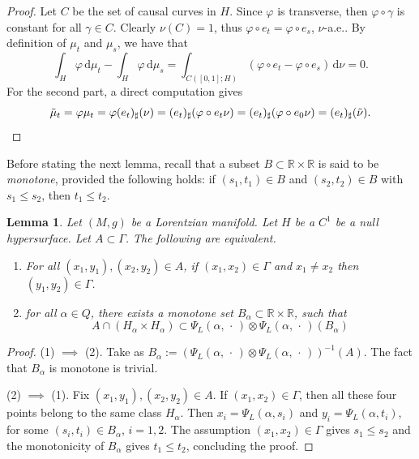 \documentclass[12pt,a4paper]{amsart}
\theoremstyle{plain}
\newtheorem{lemma}{Lemma}[section]
\theoremstyle{definition}
\numberwithin{equation}{section}
\newcommand{\R}{\mathbb{R}}
\newcommand{\de}{{\mathrm{d}}}
\newcommand{\dotargument}{\,\cdot\,}
\newcommand{\gflow}{\Psi}
\begin{document}
\begin{proof}
  Let $C$ be the set of causal curves in $H$.
  Since $\varphi$ is transverse, then $\varphi \circ\gamma$ is constant for all
  $\gamma\in C$.
   Clearly $\nu(C)=1$,  thus 
  $\varphi \circ e_t=\varphi \circ e_s$, $\nu$-a.e..
  By definition of $\mu_t$ and $\mu_s$, we have that
  \begin{equation}
    \int_H
    \varphi
    \,\de\mu_t
    -
    \int_H
    \varphi
    \,\de\mu_s
    =
    \int_{C([0,1];H)}
    (
    \varphi\circ e_t-
    \varphi\circ e_s
    )
    \,
    \de \nu
    =0
    .
  \end{equation}
%
  For the second part, a direct computation gives
  \begin{equation}
    \tilde\mu_t=\varphi\mu_t
    =
    \varphi(e_t)_{\sharp}(\nu)
    =
    (e_t)_{\sharp}(\varphi\circ e_t \nu)
    =
    (e_t)_{\sharp}(\varphi\circ e_0 \nu)
    =
    (e_t)_{\sharp}(\tilde\nu).
    \qedhere
  \end{equation}
\end{proof}

Before stating the next lemma, recall that a subset $B\subset \R\times \R$ is said to be \emph{monotone}, provided  the following holds: if $(s_1,t_1)\in B$ and $(s_2,t_2)\in B$ with $s_1\leq s_2$, then $t_1\leq t_2$.

\begin{lemma}
  \label{lem:monotonicity-of-sets} Let $(M,g)$ be a Lorentzian manifold.
  Let $H$ be a $C^1$ be a null hypersurface.
  Let $A\subset \Gamma$.
  The following are equivalent.
  \begin{enumerate}
  \item
    For all $(x_1,y_1),(x_2,y_2)\in A$, if 
    $(x_1,x_2)\in\Gamma$ and $x_1\neq x_2$ then
    $(y_1,y_2)\in\Gamma$.
  \item
    for all $\alpha\in Q$, there exists a monotone set
    $B_\alpha\subset\R\times\R$, such that
    \begin{equation}
      A\cap (H_\alpha\times H_\alpha)
      \subset
      \gflow_L(\alpha,\dotargument)
      \otimes
      \gflow_L(\alpha,\dotargument)
      (B_\alpha)
    \end{equation}
  \end{enumerate}
\end{lemma}
\begin{proof}
  (1) $\implies$ (2).
  \quad
  Take as
  $B_\alpha:=( \gflow_L(\alpha,\dotargument) \otimes \gflow_L(\alpha,\dotargument))^{-1}(A)$.
  The fact that $B_\alpha$ is monotone is trivial.

  (2) $\implies$ (1).
  \quad
  Fix $(x_1,y_1),(x_2,y_2)\in A$.
  If $(x_1,x_2)\in\Gamma$, then all these four points belong to the
  same class $H_\alpha$.
  Then $x_i=\gflow_L(\alpha, s_i)$ and $y_i=\gflow_L(\alpha, t_i)$, for some
  $(s_i,t_i)\in B_\alpha$, $i=1,2$.
  The assumption $(x_1,x_2)\in\Gamma$ gives $s_1\leq s_2$ and the
  monotonicity of $B_\alpha$ gives $t_1\leq t_2$, concluding the
  proof.
\end{proof}
\end{document}
